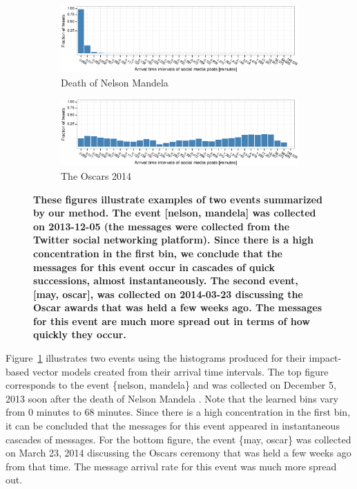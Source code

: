 \documentclass[10pt,letterpaper]{article}
\begin{document}
\begin{figure}
  \centering
  \begin{subfigure}[b]{\textwidth}
    \includegraphics[width=\textwidth]{figures_SI/Plots_from_data/nelson_mandela_buzz_example}
    \caption{Death of Nelson Mandela}
  \end{subfigure}
  \begin{subfigure}[b]{\textwidth}
    \includegraphics[width=\textwidth]{figures_SI/Plots_from_data/may_oscar_buzz_example}
    \caption{The Oscars 2014}
  \end{subfigure}
  \caption{\textbf{These figures illustrate examples of two events
      summarized by our method. The event [nelson, mandela] was
      collected on 2013-12-05 (the messages were collected from the
      Twitter social networking platform). Since there is a high
      concentration in the first bin, we conclude that the messages
      for this event occur in cascades of quick successions, almost
      instantaneously. The second event, [may, oscar], was collected
      on 2014-03-23 discussing the Oscar awards that was held a few
      weeks ago. The messages for this event are much more spread out
      in terms of how quickly they occur.}}
  \label{fig:example_buzz}
\end{figure}

Figure~\ref{fig:example_buzz} illustrates two events using the
histograms produced for their impact-based vector models created from
their arrival time intervals. The top figure corresponds to the event
\{nelson, mandela\} and was collected on December 5, 2013 soon after
the death of Nelson
Mandela \cite{nelson_mandela_dead}.
Note that the learned bins vary from
$0$ minutes to $68$ minutes. Since there is a high concentration in
the first bin, it can be concluded that the messages for this event
appeared in instantaneous cascades of messages. For the bottom figure,
the event \{may, oscar\} was collected on March 23, 2014 discussing
the Oscars ceremony that was held a few weeks ago from that time. The
message arrival rate for this event was much more spread out.
\end{document}
